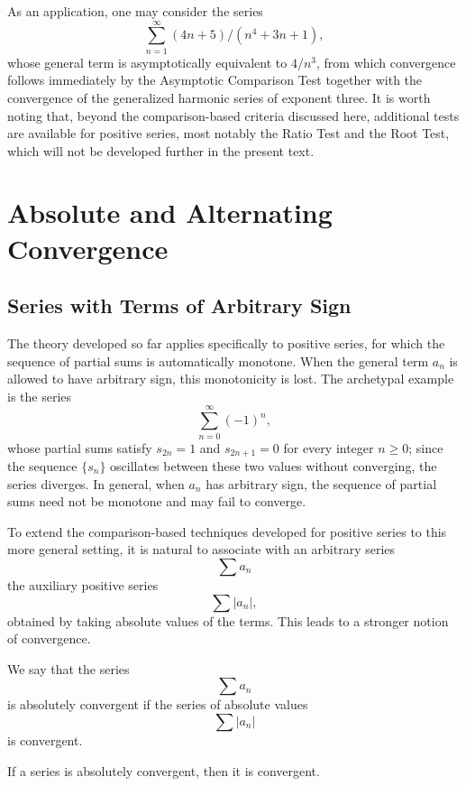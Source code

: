 As an application, one may consider the series \[
\sum_{n=1}^{\infty} (4n+5)/(n^4 + 3n + 1),
\] whose general term is asymptotically equivalent to $4/n^3$, from which convergence follows immediately by the Asymptotic Comparison Test together with the convergence of the generalized harmonic series of exponent three. It is worth noting that, beyond the comparison-based criteria discussed here, additional tests are available for positive series, most notably the Ratio Test and the Root Test, which will not be developed further in the present text.

\section{Absolute and Alternating Convergence}

\subsection{Series with Terms of Arbitrary Sign}

The theory developed so far applies specifically to positive series, for which the sequence of partial sums is automatically monotone. When the general term $a_n$ is allowed to have arbitrary sign, this monotonicity is lost. The archetypal example is the series \[
\sum_{n=0}^{\infty} (-1)^n,
\] whose partial sums satisfy $s_{2n} = 1$ and $s_{2n+1} = 0$ for every integer $n \geq 0$; since the sequence $\{s_n\}$ oscillates between these two values without converging, the series diverges. In general, when $a_n$ has arbitrary sign, the sequence of partial sums need not be monotone and may fail to converge.

To extend the comparison-based techniques developed for positive series to this more general setting, it is natural to associate with an arbitrary series \[
\sum a_n
\] the auxiliary positive series \[
\sum |a_n|,
\] obtained by taking absolute values of the terms. This leads to a stronger notion of convergence.

\begin{definition}
We say that the series \[
\sum a_n
\] is absolutely convergent if the series of absolute values \[
\sum |a_n|
\] is convergent.
\end{definition}

\begin{theorem}
If a series is absolutely convergent, then it is convergent.
\end{theorem}

